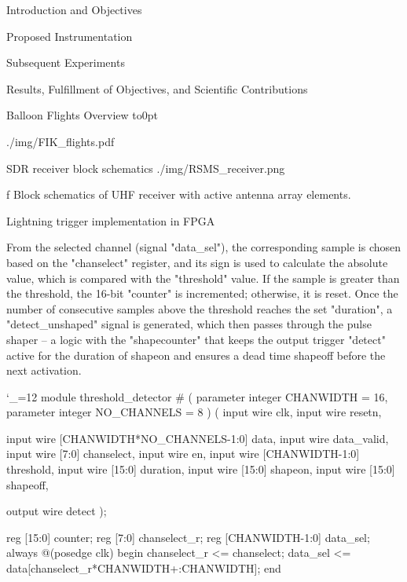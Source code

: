 \chap Introduction and Objectives




%

\chap[instrumentation] Proposed Instrumentation



\chap[experiments] Subsequent Experiments



\chap[results] Results, Fulfillment of Objectives, and Scientific Contributions



 Balloon Flights Overview
\vbox to0pt{\vskip-25mm\centerline{\inspic ./img/FIK_flights.pdf }\vss}
\nextoddpage

 SDR receiver block schematics
\medskip
\picw=8cm \cinspic ./img/RSMS_receiver.png
\caption/f Block schematics of UHF receiver with active antenna array elements.
\medskip

 Lightning trigger implementation in FPGA

From the selected channel (signal "data_sel"), the corresponding sample is chosen based on the "chanselect" register, and its sign is used to calculate the absolute value, which is compared with the "threshold" value. If the sample is greater than the threshold, the 16-bit "counter" is incremented; otherwise, it is reset. Once the number of consecutive samples above the threshold reaches the set "duration", a "detect_unshaped" signal is generated, which then passes through the pulse shaper – a logic with the "shapecounter" that keeps the output trigger "detect" active for the duration of shapeon and ensures a dead time shapeoff before the next activation.

\begtt\catcode`\_=12
module threshold_detector #
	(
		parameter integer CHANWIDTH = 16,
		parameter integer NO_CHANNELS = 8
	)
	(
		input  wire clk,
		input  wire resetn,


		input  wire [CHANWIDTH*NO_CHANNELS-1:0] data,
		input  wire data_valid,
		input  wire [7:0] chanselect,
		input  wire en,
		input  wire [CHANWIDTH-1:0] threshold,
		input  wire [15:0] duration,
		input  wire [15:0] shapeon,
		input  wire [15:0] shapeoff,


		output wire detect
	);


	reg [15:0] counter;
	reg [7:0] chanselect_r;
	reg [CHANWIDTH-1:0] data_sel;
	always @(posedge clk)
	begin
		chanselect_r <= chanselect;
		data_sel <= data[chanselect_r*CHANWIDTH+:CHANWIDTH];
	end


